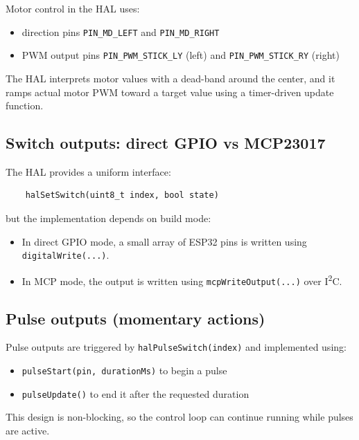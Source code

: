 Motor control in the HAL uses:

\begin{itemize}
    \item direction pins \texttt{PIN\_MD\_LEFT} and \texttt{PIN\_MD\_RIGHT}
    \item PWM output pins \texttt{PIN\_PWM\_STICK\_LY} (left) and \texttt{PIN\_PWM\_STICK\_RY} (right)
\end{itemize}

The HAL interprets motor values with a dead-band around the center, and it ramps actual motor PWM
toward a target value using a timer-driven update function.

\subsection{Switch outputs: direct GPIO vs MCP23017}
\label{subsec:control-hal-hal-switches}

The HAL provides a uniform interface:

\begin{verbatim}
    halSetSwitch(uint8_t index, bool state)
\end{verbatim}

but the implementation depends on build mode:

\begin{itemize}
    \item In direct GPIO mode, a small array of ESP32 pins is written using \texttt{digitalWrite(...)}.
    \item In MCP mode, the output is written using \texttt{mcpWriteOutput(...)} over I\textsuperscript{2}C.
\end{itemize}

\subsection{Pulse outputs (momentary actions)}
\label{subsec:control-hal-hal-pulses}

Pulse outputs are triggered by \texttt{halPulseSwitch(index)} and implemented using:

\begin{itemize}
    \item \texttt{pulseStart(pin, durationMs)} to begin a pulse
    \item \texttt{pulseUpdate()} to end it after the requested duration
\end{itemize}

This design is non-blocking, so the control loop can continue running while pulses are active.

